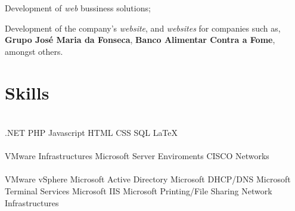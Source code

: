 \documentclass[letterpaper]{deedy-resume} %
\begin{document}
\begin{minipage}[t]{0.66\textwidth}
\sectionspace


\begin{tightitemize}
	\item Development of \textit{web} bussiness solutions;
	\item Development of the company's \textit{website}, and \textit{websites} for companies such as, \textbf{Grupo José Maria da Fonseca}, \textbf{Banco Alimentar Contra a Fome}, amongst others.
\end{tightitemize}

\sectionspace

\section{Skills}

\\
.NET \textbullet{} PHP \textbullet{} Javascript \textbullet{} HTML \textbullet{} CSS \textbullet{} SQL \textbullet{} \LaTeX{}\\
\\
VMware Infrastructures \textbullet{} Microsoft Server Enviroments \textbullet{} CISCO Networks\\
\\
VMware vSphere \textbullet{} Microsoft Active Directory \textbullet{} Microsoft DHCP/DNS \textbullet{} Microsoft Terminal Services \textbullet{} Microsoft IIS \textbullet{} Microsoft Printing/File Sharing \textbullet{} Network Infrastructures

\end{minipage} %








\end{document}
